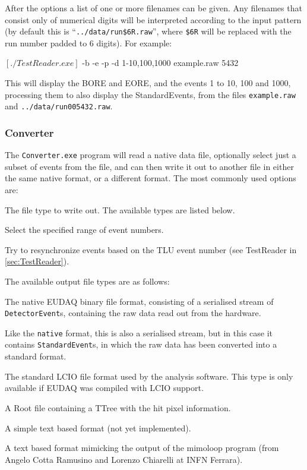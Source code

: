 After the options a list of one or more filenames can be given.
Any filenames that consist only of numerical digits
will be interpreted according to the input pattern
(by default this is ``\texttt{../data/run\$6R.raw}'',
where \texttt{\$6R} will be replaced with the run number padded to 6 digits).
For example:
\begin{listing}[mybash]
$[./TestReader.exe]$ -b -e -p -d 1-10,100,1000 example.raw 5432
\end{listing}

This will display the \gls{BORE} and \gls{EORE}, and the events 1 to 10, 100 and 1000,
processing them to also display the StandardEvents,
from the files \texttt{example.raw} and \texttt{../data/run005432.raw}.

\subsubsection{Converter}\label{sec:Converter}
The \texttt{Converter.exe} program will read a native data file,
optionally select just a subset of events from the file,
and can then write it out to another file in either the same native format, or a different format.
The most commonly used options are:
\begin{description}
The file type to write out.
The available types are listed below.

Select the specified range of event numbers.

Try to resynchronize events based on the TLU event number
(see TestReader in \autoref{sec:TestReader}).

\end{description}

The available output file types are as follows:

\begin{description}\label{lst:FileTypes}

The native EUDAQ binary file format, consisting of a serialised stream of
\texttt{DetectorEvent}s, containing the raw data read out from the hardware.

Like the \texttt{native} format, this is also a serialised stream,
but in this case it contains \texttt{StandardEvent}s,
in which the raw data has been converted into a standard format.

The standard \gls{LCIO} file format used by the analysis software.
This type is only available if EUDAQ was compiled with \gls{LCIO} support.

A Root file containing a TTree with the hit pixel information.

A simple text based format (not yet implemented).

A text based format mimicking the output of the mimoloop program
(from Angelo Cotta Ramusino and Lorenzo Chiarelli at INFN Ferrara).

\end{description}


